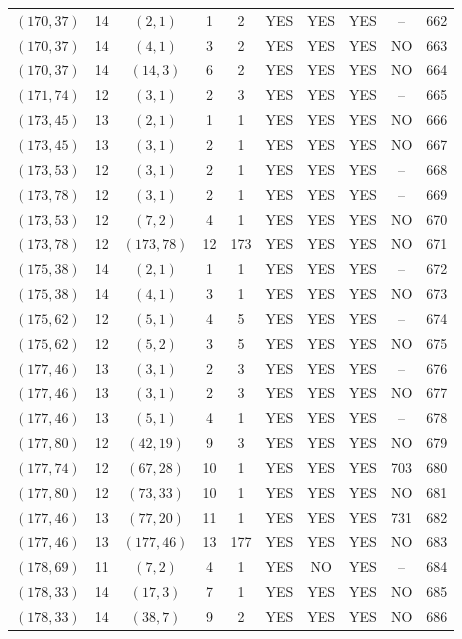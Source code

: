 \begin{longtable}{|c|c|c|c|c|c|c|c|c|c|}
$(170, 37)$ & 14 & $(2, 1)$ & 1 & 2 & YES & YES & YES & -- & 662\\
$(170, 37)$ & 14 & $(4, 1)$ & 3 & 2 & YES & YES & YES & NO & 663\\
$(170, 37)$ & 14 & $(14, 3)$ & 6 & 2 & YES & YES & YES & NO & 664\\
$(171, 74)$ & 12 & $(3, 1)$ & 2 & 3 & YES & YES & YES & -- & 665\\
$(173, 45)$ & 13 & $(2, 1)$ & 1 & 1 & YES & YES & YES & NO & 666\\
$(173, 45)$ & 13 & $(3, 1)$ & 2 & 1 & YES & YES & YES & NO & 667\\
$(173, 53)$ & 12 & $(3, 1)$ & 2 & 1 & YES & YES & YES & -- & 668\\
$(173, 78)$ & 12 & $(3, 1)$ & 2 & 1 & YES & YES & YES & -- & 669\\
$(173, 53)$ & 12 & $(7, 2)$ & 4 & 1 & YES & YES & YES & NO & 670\\
$(173, 78)$ & 12 & $(173, 78)$ & 12 & 173 & YES & YES & YES & NO & 671\\
$(175, 38)$ & 14 & $(2, 1)$ & 1 & 1 & YES & YES & YES & -- & 672\\
$(175, 38)$ & 14 & $(4, 1)$ & 3 & 1 & YES & YES & YES & NO & 673\\
$(175, 62)$ & 12 & $(5, 1)$ & 4 & 5 & YES & YES & YES & -- & 674\\
$(175, 62)$ & 12 & $(5, 2)$ & 3 & 5 & YES & YES & YES & NO & 675\\
$(177, 46)$ & 13 & $(3, 1)$ & 2 & 3 & YES & YES & YES & -- & 676\\
$(177, 46)$ & 13 & $(3, 1)$ & 2 & 3 & YES & YES & YES & NO & 677\\
$(177, 46)$ & 13 & $(5, 1)$ & 4 & 1 & YES & YES & YES & -- & 678\\
$(177, 80)$ & 12 & $(42, 19)$ & 9 & 3 & YES & YES & YES & NO & 679\\
$(177, 74)$ & 12 & $(67, 28)$ & 10 & 1 & YES & YES & YES & 703 & 680\\
$(177, 80)$ & 12 & $(73, 33)$ & 10 & 1 & YES & YES & YES & NO & 681\\
$(177, 46)$ & 13 & $(77, 20)$ & 11 & 1 & YES & YES & YES & 731 & 682\\
$(177, 46)$ & 13 & $(177, 46)$ & 13 & 177 & YES & YES & YES & NO & 683\\
$(178, 69)$ & 11 & $(7, 2)$ & 4 & 1 & YES & NO & YES & -- & 684\\
$(178, 33)$ & 14 & $(17, 3)$ & 7 & 1 & YES & YES & YES & NO & 685\\
$(178, 33)$ & 14 & $(38, 7)$ & 9 & 2 & YES & YES & YES & NO & 686\\

\end{longtable}
